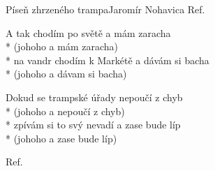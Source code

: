 \documentclass[10.5pt]{book}
\begin{document}
\begin{poem}{Píseň zhrzeného trampa}{Jaromír Nohavica}
Ref.

\begin{altverse}
A tak chodím po světě
a mám zaracha\\*
(johoho a mám zaracha)\\*
na vandr chodím k Markétě
a dávám si bacha\\*
(johoho a dávam si bacha)
\end{altverse}

\begin{altverse}
Dokud se trampské úřady
nepoučí z chyb\\*
(johoho a nepoučí z chyb)\\*
zpívám si to svý nevadí
a zase bude líp\\*
(johoho a zase bude líp)
\end{altverse}

Ref.

\end{poem}
\end{document}

